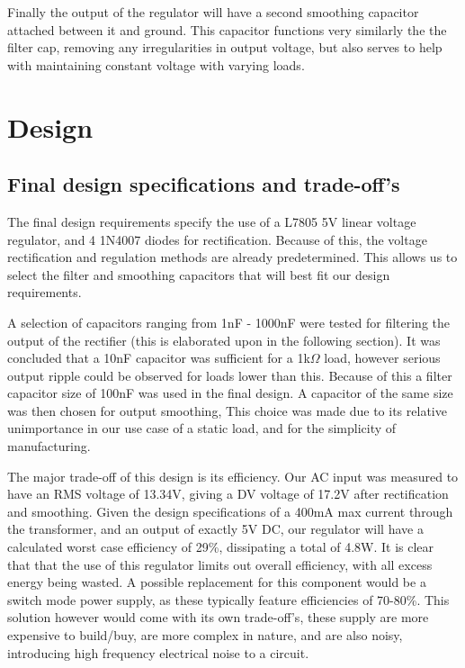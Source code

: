 \documentclass[a4paper,11pt]{article}
\begin{document}
Finally the output of the regulator will have a second smoothing capacitor attached between it and ground. This capacitor functions very similarly the the filter cap, removing any irregularities in output voltage, but also serves to help with maintaining constant voltage with varying loads.

\section{Design}
\subsection{Final design specifications and trade-off's}

The final design requirements specify the use of a L7805 5V linear voltage regulator, and 4 1N4007 diodes for rectification. Because of this, the voltage rectification and regulation methods are already predetermined. This allows us to select the filter and smoothing capacitors that will best fit our design requirements.
 
A selection of capacitors ranging from 1nF - 1000nF were tested for filtering the output of the rectifier (this is elaborated upon in the following section). It was concluded that a 10nF capacitor was sufficient for a 1k$\Omega$ load, however serious output ripple could be observed for loads lower than this. Because of this a filter capacitor size of 100nF was used in the final design. A capacitor of the same size was then chosen for output smoothing, This choice was made due to its relative unimportance in our use case of a static load, and for the simplicity of manufacturing. 

The major trade-off of this design is its efficiency. Our AC input was measured to have an RMS voltage of 13.34V, giving a DV voltage of 17.2V after rectification and smoothing. Given the design specifications of a 400mA max current through the transformer, and an output of exactly 5V DC, our regulator will have a calculated worst case efficiency of 29\%, dissipating a total of 4.8W. It is clear that that the use of this regulator limits out overall efficiency, with all excess energy being wasted. A possible replacement for this component would be a switch mode power supply, as these typically feature efficiencies of 70-80\%. This solution however would come with its own trade-off's, these supply are more expensive to build/buy, are more complex in nature, and are also noisy, introducing high frequency electrical noise to a circuit.
\end{document}
